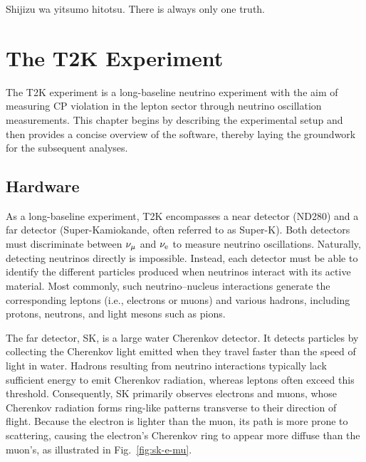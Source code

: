 \begin{savequote}[8cm]
Shijizu wa yitsumo hitotsu. 
There is always only one truth.
\end{savequote}

\chapter{\label{ch:t2k}The T2K Experiment} 

\minitoc
The T2K experiment is a long-baseline neutrino experiment with the aim of measuring CP violation in the lepton sector through neutrino oscillation measurements.  
This chapter begins by describing the experimental setup and then provides a concise overview of the software, thereby laying the groundwork for the subsequent analyses.

\section{Hardware}
As a long-baseline experiment, T2K encompasses a near detector (ND280) and a far detector (Super-Kamiokande, often referred to as Super-K).  
Both detectors must discriminate between \(\nu_{\mu}\) and \(\nu_{\textrm{e}}\) to measure neutrino oscillations.  
Naturally, detecting neutrinos directly is impossible.  
Instead, each detector must be able to identify the different particles produced when neutrinos interact with its active material.  
Most commonly, such neutrino–nucleus interactions generate the corresponding leptons (i.e., electrons or muons) and various hadrons, including protons, neutrons, and light mesons such as pions.

The far detector, SK, is a large water Cherenkov detector.  
It detects particles by collecting the Cherenkov light emitted when they travel faster than the speed of light in water.  
Hadrons resulting from neutrino interactions typically lack sufficient energy to emit Cherenkov radiation, whereas leptons often exceed this threshold.  
Consequently, SK primarily observes electrons and muons, whose Cherenkov radiation forms ring-like patterns transverse to their direction of flight.  
Because the electron is lighter than the muon, its path is more prone to scattering, causing the electron’s Cherenkov ring to appear more diffuse than the muon’s, as illustrated in Fig.~\ref{fig:sk-e-mu}.

